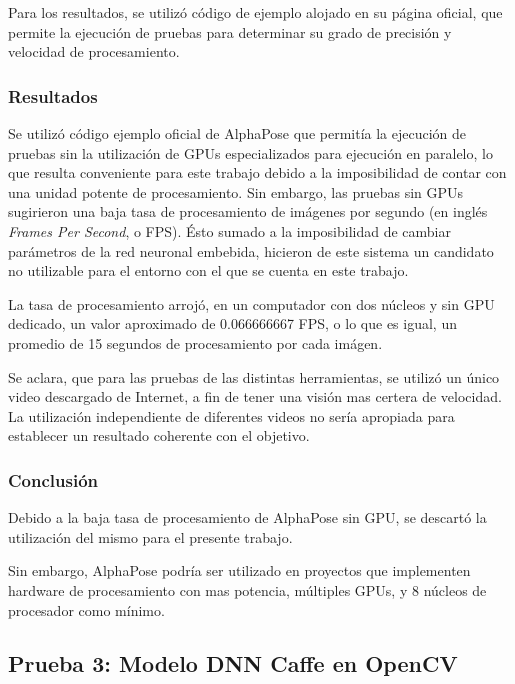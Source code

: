 \documentclass[a4paper,12pt,oneside,spanish]{book}
\begin{document}
Para los resultados, se utilizó código de ejemplo alojado en su página oficial, que permite la ejecución de pruebas para determinar su grado de precisión y velocidad de procesamiento.\par

\subsubsection{Resultados}
Se utilizó código ejemplo oficial de AlphaPose que permitía la ejecución de pruebas sin la utilización de GPUs especializados para ejecución en paralelo, lo que resulta conveniente para este trabajo debido a la imposibilidad de contar con una unidad potente de procesamiento. Sin embargo, las pruebas sin GPUs sugirieron una baja tasa de procesamiento de imágenes por segundo (en inglés \textit{Frames Per Second}, o FPS). Ésto sumado a la imposibilidad de cambiar parámetros de la red neuronal embebida, hicieron de este sistema un candidato no utilizable para el entorno con el que se cuenta en este trabajo.\par

La tasa de procesamiento arrojó, en un computador con dos núcleos y sin GPU dedicado, un valor aproximado de 0.066666667 FPS, o lo que es igual, un promedio de 15 segundos de procesamiento por cada imágen. \par

Se aclara, que para las pruebas de las distintas herramientas, se utilizó un único video descargado de Internet, a fin de tener una visión mas certera de velocidad. La utilización independiente de diferentes videos no sería apropiada para establecer un resultado coherente con el objetivo.\par

\subsubsection{Conclusión}
Debido a la baja tasa de procesamiento de AlphaPose sin GPU, se descartó la utilización del mismo para el presente trabajo.\par 

Sin embargo, AlphaPose podría ser utilizado en proyectos que implementen hardware de procesamiento con mas potencia, múltiples GPUs, y 8 núcleos de procesador como mínimo.\par

\subsection{Prueba 3: Modelo DNN Caffe en OpenCV}
\end{document}
